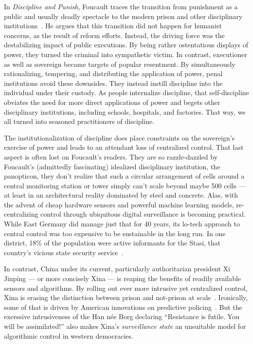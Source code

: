 In \emph{Discipline and Punish}, Foucault traces the transition from punishment
as a public and usually deadly spectacle to the modern prison and other
disciplinary institutions~\cite{Foucault1979}. He argues that this transition
did not happen for humanist concerns, as the result of reform efforts. Instead,
the driving force was the destabilizing impact of public executions. By being
rather ostentatious displays of power, they turned the criminal into sympathetic
victim. In contrast, executioner as well as sovereign became targets of popular
resentment. By simultaneously rationalizing, tempering, and distributing the
application of power, penal institutions avoid these downsides. They instead
instill discipline into the individual under their custody. As people
internalize discipline, that self-discipline obviates the need for more direct
applications of power and begets other disciplinary institutions, including
schools, hospitals, and factories. That way, we all turned into seasoned
practitioners of discipline.

The institutionalization of discipline does place constraints on the sovereign's
exercise of power and leads to an attendant loss of centralized control. That
last aspect is often lost on Foucault's readers. They are so razzle-dazzled by
Foucault's (admittedly fascinating) idealized disciplinary institution, the
panopticon, they don't realize that such a circular arrangement of cells around
a central monitoring station or tower simply can't scale beyond maybe 500 cells
--- at least in an architectural reality dominated by steel and concrete. Alas,
with the advent of cheap hardware sensors and powerful machine learning models,
re-centralizing control through ubiquitous digital surveillance is becoming
practical. While East Germany did manage just that for 40 years, its lo-tech
approach to central control was too expensive to be sustainable in the long run.
In one district, 18\% of the population were active informants for the Stasi,
that country's vicious state security service~\cite{Kellerhoff2022}.

In contrast, China under its current, particularly authoritarian president Xi
Jinping --- or more concisely Xina --- is reaping the benefits of readily
available sensors and algorithms. By rolling out ever more intrusive yet
centralized control, Xina is erasing the distinction between prison and
not-prison at scale~\cite{Grauer2021,MozurXiaoea2022,SmithIV2016}. Ironically,
some of that is driven by American innovations on predictive
policing~\cite{PerryMcInnisea2013,SmithIV2016,Sprick2019}. But the excessive
intrusiveness of the Han n\'ee Borg declaring ``Resistance is futile. You will
be assimilated!'' also makes Xina's \emph{surveillance state} an unsuitable
model for algorithmic control in western democracies.


